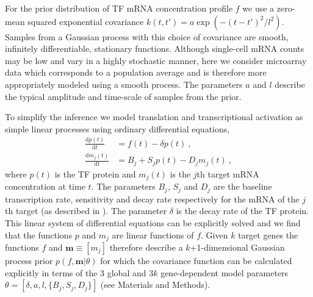 \documentclass{pnastwo}
\begin{document}
\begin{article}
For the prior distribution of TF mRNA concentration profile $f$ we use a zero-mean squared exponential covariance
$k(t,t')=a\exp(-(t-t')^2/l^2)$. Samples from a Gaussian process with this choice
of covariance are smooth, infinitely differentiable, stationary functions. Although single-cell mRNA counts may be low
and vary in a highly stochastic manner, here we consider microarray data which
corresponds to a population average and is therefore more
appropriately modeled using a smooth process. The parameters $a$ and
$l$ describe the typical amplitude and time-scale of samples from
the prior. 

To simplify the inference we model translation and transcriptional
activation as simple linear processes using ordinary differential
equations,
\begin{align}
  \frac{\mathrm{d}p(t)}{\mathrm{d}t} & = f(t) - \delta
  p(t) \ , \label{eq:translation_ode} \\
  \frac{\mathrm{d}m_j(t)}{\mathrm{d}t} & = B_j+S_j p(t)-D_j m_j(t) \ , \label{eq:transcription_ode}
\end{align}
where $p(t)$ is the TF protein and $m_j(t)$ is the $j$th target mRNA
concentration at time $t$. The parameters $B_j$, $S_j$ and $D_j$ are the
baseline transcription rate, sensitivity and decay rate respectively
for the mRNA of the $j$th target (as described in \cite{Barenco2006a}).
The parameter $\delta$ is the decay rate of the TF protein.
This linear system of differential equations can be
explicitly solved and we find that the functions $p$ and $m_j$ are
linear functions of $f$. Given $k$ target genes the functions $f$ and $\bm m\equiv[m_j]$ therefore
describe a $k$+1-dimensional Gaussian process prior $p(f,\bm m|\theta)$
for which the covariance function can be calculated explicitly in terms of the
$3$ global and $3k$ gene-dependent model parameters
$\theta=[\delta,a,l,\{B_j,S_j,D_j\}]$ (see Materials and Methods). 


\end{article}
\end{document}
